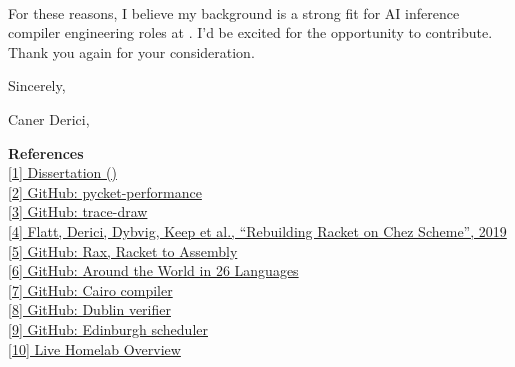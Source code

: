 \paragraph{} %
For these reasons, I believe my background is a strong fit for AI inference compiler engineering roles at . I'd be excited for the opportunity to contribute. Thank you again for your consideration.

\vspace{1.2em}

Sincerely,

Caner Derici, 

\vfill

{\small
	\noindent\textbf{References} \\[0.25em]
	\noindent \href{\dissertationurl}{[1]  Dissertation ()} \\
	\noindent \href{\pycketperfurl}{[2] GitHub: pycket-performance} \\
	\noindent \href{\tracedrawurl}{[3] GitHub: trace-draw} \\
	\noindent \href{\icfpreporturl}{[4] Flatt, Derici, Dybvig, Keep et al., ``Rebuilding Racket on Chez Scheme'',  2019} \\
	\noindent \href{\raxurl}{[5] GitHub: Rax, Racket to  Assembly} \\
	\noindent \href{\atwurl}{[6] GitHub: Around the World in 26 Languages} \\
	\noindent \href{\cairolang}{[7] GitHub: Cairo compiler} \\
	\noindent \href{\dublinlang}{[8] GitHub: Dublin verifier} \\
	\noindent \href{\edinlang}{[9] GitHub: Edinburgh scheduler} \\
	\noindent \href{\homelaburl}{[10] Live Homelab Overview}
}



